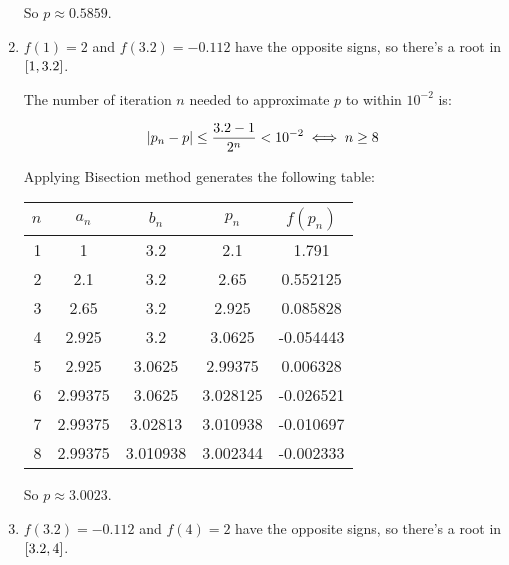 \documentclass[../../Assignments.tex]{subfiles}
\begin{document}
\begin{solution}
\begin{enumerate}[label = (\alph*)]
            So \(p \approx \num{0.5859}\).

        \item \(f(1) = 2\) and \(f(\num{3.2}) = \num{-0.112}\) have the opposite
            signs, so there's a root in \(\interval{1}{\num{3.2}}\).

            The number of iteration \(n\) needed to approximate \(p\) to within
            \(10^{-2}\) is:

            \[\abs{p_n - p} \leq \frac{\num{3.2} - 1}{2^n} < 10^{-2} \iff n \geq 8\]

            Applying Bisection method generates the following table:

            \begin{table}[H]
                \centering
                \begin{tabular}{r S[table-format=1.5] S[table-format=1.6] S[table-format=1.6] S[table-format=-1.6]}
                    \toprule
                    \(n\)  &  {\(a_n\)}  &  {\(b_n\)}  &  {\(p_n\)}  &  {\(f(p_n)\)}  \\
                      &  1          &  3.2        &  2.1        &   1.791        \\
                        2  &  2.1        &  3.2        &  2.65       &   0.552125     \\
                        3  &  2.65       &  3.2        &  2.925      &   0.085828     \\
                        4  &  2.925      &  3.2        &  3.0625     &  -0.054443     \\
                        5  &  2.925      &  3.0625     &  2.99375    &   0.006328     \\
                        6  &  2.99375    &  3.0625     &  3.028125   &  -0.026521     \\
                        7  &  2.99375    &  3.02813    &  3.010938   &  -0.010697     \\
                        8  &  2.99375    &  3.010938   &  3.002344   &  -0.002333     \\
                    \bottomrule
                \end{tabular}
            \end{table}

            So \(p \approx \num{3.0023}\).

        \item \(f(\num{3.2}) = \num{-0.112}\) and \(f(4) = 2\) have the opposite
            signs, so there's a root in \(\interval{\num{3.2}}{4}\).


\end{enumerate}
\end{solution}
\end{document}
